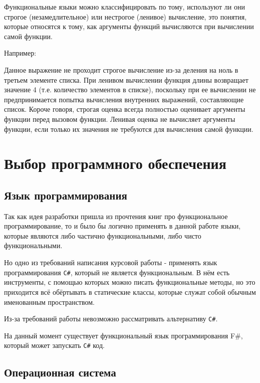 Функциональные языки можно классифицировать по тому, используют ли они строгое (незамедлительное) или нестрогое (ленивое) вычисление, это понятия, которые относятся к тому, как аргументы функций вычисляются при вычислении самой функции.

Например:

\begin{code}
	
\end{code}

Данное выражение не проходит строгое вычисление из-за деления на ноль в третьем элементе списка.
При ленивом вычислении функция длины возвращает значение 4 (т.е. количество элементов в списке), поскольку при ее вычислении не предпринимается попытка вычисления внутренних выражений, составляющие список.
Короче говоря, строгая оценка всегда полностью оценивает аргументы функции перед вызовом функции.
Ленивая оценка не вычисляет аргументы функции, если только их значения не требуются для вычисления самой функции.


\newpage
\section{Выбор программного обеспечения}

\subsection{Язык программирования}

Так как идея разработки пришла из прочтения книг про функциональное программирование, то и было бы логично применять в данной работе языки, которые являются либо частично функциональными, либо чисто функциональными.

Но одно из требований написания курсовой работы - применять язык программирования \texttt{C\#}, который не является функциональным.
В нём есть инструменты, с помощью которых можно писать функциональные методы, но это приходится всё обёртывать в статические классы, которые служат собой обычным именованным пространством.

Из-за требований работы невозможно рассматривать альтернативу \texttt{C\#}.

На данный момент существует функциональный язык программирования F\#, который может запускать \texttt{C\#} код.

\subsection{Операционная система}

